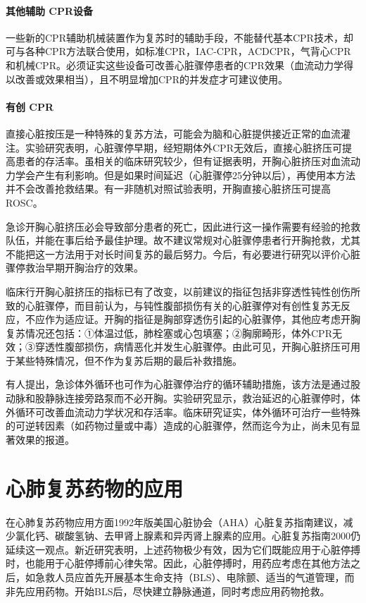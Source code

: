 \paragraph{其他辅助 CPR设备}

一些新的CPR辅助机械装置作为复苏时的辅助手段，不能替代基本CPR技术，却可与各种CPR方法联合使用，如标准CPR，IAC-CPR，ACDCPR，气背心CPR和机械CPR。必须证实这些设备可改善心脏骤停患者的CPR效果（血流动力学得以改善或效果相当），且不明显增加CPR的并发症才可建议使用。

\paragraph{有创 CPR}

直接心脏按压是一种特殊的复苏方法，可能会为脑和心脏提供接近正常的血流灌注。实验研究表明，心脏骤停早期，经短期体外CPR无效后，直接心脏挤压可提高患者的存活率。虽相关的临床研究较少，但有证据表明，开胸心脏挤压对血流动力学会产生有利影响。但是如果时间延迟（心脏骤停25分钟以后），再使用本方法并不会改善抢救结果。有一非随机对照试验表明，开胸直接心脏挤压可提高ROSC。

急诊开胸心脏挤压必会导致部分患者的死亡，因此进行这一操作需要有经验的抢救队伍，并能在事后给予最佳护理。故不建议常规对心脏骤停患者行开胸抢救，尤其不能把这一方法用于对长时间复苏的最后努力。今后，有必要进行研究以评价心脏骤停救治早期开胸治疗的效果。

临床行开胸心脏挤压的指标已有了改变，以前建议的指征包括非穿透性钝性创伤所致的心脏骤停，而目前认为，与钝性腹部损伤有关的心脏骤停对有创性复苏无反应，不应作为适应证。开胸的指征是胸部穿透伤引起的心脏骤停，其他应考虑开胸复苏情况还包括：①体温过低，肺栓塞或心包填塞；②胸廓畸形，体外CPR无效；③穿透性腹部损伤，病情恶化并发生心脏骤停。由此可见，开胸心脏挤压可用于某些特殊情况，但不作为复苏后期的最后补救措施。

有人提出，急诊体外循环也可作为心脏骤停治疗的循环辅助措施，该方法是通过股动脉和股静脉连接旁路泵而不必开胸。实验研究显示，救治延迟的心脏骤停时，体外循环可改善血流动力学状况和存活率。临床研究证实，体外循环可治疗一些特殊的可逆转因素（如药物过量或中毒）造成的心脏骤停，然而迄今为止，尚未见有显著效果的报道。

\protect\hypertarget{text00285.html}{}{}

\section{心肺复苏药物的应用}

在心肺复苏药物应用方面1992年版美国心脏协会（AHA）心脏复苏指南建议，减少氯化钙、碳酸氢钠、去甲肾上腺素和异丙肾上腺素的应用。心脏复苏指南2000仍延续这一观点。新近研究表明，上述药物极少有效，因为它们既能应用于心脏停搏时，也能用于心脏停搏前心律失常。因此，心脏停搏时，用药应考虑在其他方法之后，如急救人员应首先开展基本生命支持（BLS）、电除颤、适当的气道管理，而非先应用药物。开始BLS后，尽快建立静脉通道，同时考虑应用药物抢救。

